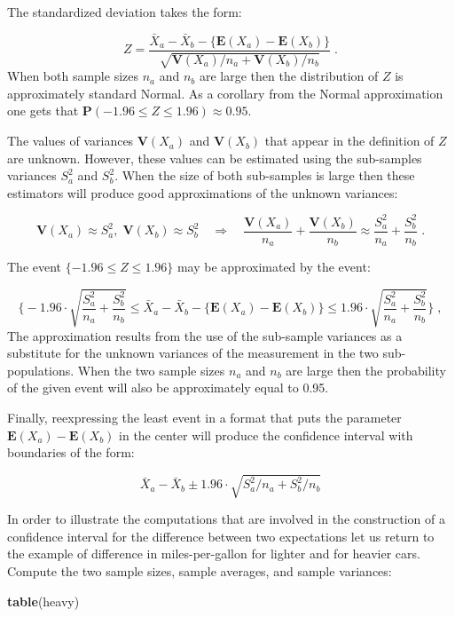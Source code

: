 \documentclass[]{krantz}
\makeatletter
\newenvironment{Shaded}{\begin{snugshade}}{\end{snugshade}}
\newcommand{\KeywordTok}[1]{\textcolor[rgb]{0.13,0.29,0.53}{\textbf{#1}}}
\newcommand{\NormalTok}[1]{#1}
\newcommand{\Expec}{\mathbf{E}}
\newcommand{\Prob}{\mathbf{P}}
\newcommand{\Var}{\mathbf{V}}
\newenvironment{kframe}{%
\medskip{}
\setlength{\fboxsep}{.8em}
 \def\at@end@of@kframe{}%
 \ifinner\ifhmode%
  \def\at@end@of@kframe{\end{minipage}}%
  \begin{minipage}{\columnwidth}%
 \fi\fi%
 \def\FrameCommand##1{\hskip\@totalleftmargin \hskip-\fboxsep
 \colorbox{shadecolor}{##1}\hskip-\fboxsep
     \hskip-\linewidth \hskip-\@totalleftmargin \hskip\columnwidth}%
 \MakeFramed {\advance\hsize-\width
   \@totalleftmargin\z@ \linewidth\hsize
   \@setminipage}}%
 {\par\unskip\endMakeFramed%
 \at@end@of@kframe}
\renewenvironment{Shaded}{\begin{kframe}}{\end{kframe}}
\theoremstyle{definition}
\theoremstyle{definition}
\theoremstyle{definition}
\theoremstyle{remark}
\makeatother
\begin{document}
The standardized deviation takes the form:

\[Z = \frac{\bar X_a- \bar X_b - \{\Expec(X_a)- \Expec(X_b)\}}{\sqrt{\Var(X_a)/n_a +\Var(X_b)/n_b}}\;.\]
When both sample sizes \(n_a\) and \(n_b\) are large then the distribution
of \(Z\) is approximately standard Normal. As a corollary from the Normal
approximation one gets that
\(\Prob(-1.96 \leq Z \leq 1.96) \approx 0.95\).

The values of variances \(\Var(X_a)\) and \(\Var(X_b)\) that appear in the
definition of \(Z\) are unknown. However, these values can be estimated
using the sub-samples variances \(S_a^2\) and \(S_b^2\). When the size of
both sub-samples is large then these estimators will produce good
approximations of the unknown variances:

\[\Var(X_a) \approx S_a^2,\; \Var(X_b) \approx S_b^2\quad \Longrightarrow \quad\frac{\Var(X_a)}{n_a} + \frac{\Var(X_b)}{n_b} \approx  \frac{S_a^2}{n_a} + \frac{S_b^2}{n_b}\;.\]

The event \(\{-1.96 \leq Z \leq 1.96\}\) may be approximated by the event:

\[\Bigg\{-1.96 \cdot \sqrt{\frac{S_a^2}{n_a} + \frac{S_b^2}{n_b}} \leq \bar X_a- \bar X_b - \{\Expec(X_a)- \Expec(X_b)\} \leq 1.96 \cdot \sqrt{\frac{S_a^2}{n_a} + \frac{S_b^2}{n_b}}\Bigg\}\;,\]
The approximation results from the use of the sub-sample variances as a
substitute for the unknown variances of the measurement in the two
sub-populations. When the two sample sizes \(n_a\) and \(n_b\) are large
then the probability of the given event will also be approximately equal
to 0.95.

Finally, reexpressing the least event in a format that puts the
parameter \(\Expec(X_a)- \Expec(X_b)\) in the center will produce the
confidence interval with boundaries of the form:

\[\bar X_a- \bar X_b \pm 1.96 \cdot \sqrt{S_a^2/n_a + S_b^2/n_b}\]

In order to illustrate the computations that are involved in the
construction of a confidence interval for the difference between two
expectations let us return to the example of difference in
miles-per-gallon for lighter and for heavier cars. Compute the two
sample sizes, sample averages, and sample variances:

\begin{Shaded}
\begin{Highlighting}[]
\KeywordTok{table}\NormalTok{(heavy)}
\end{Highlighting}
\end{Shaded}
\end{document}
